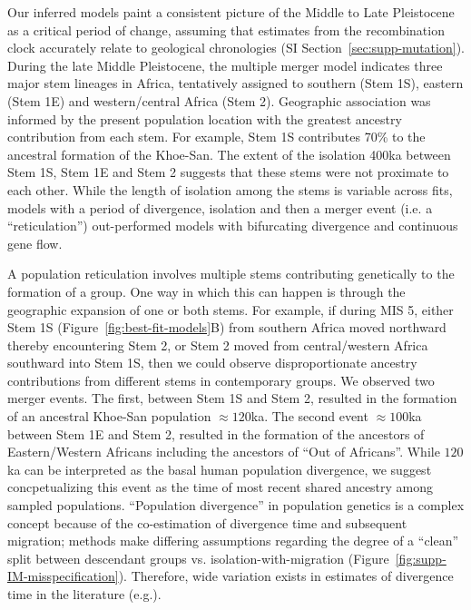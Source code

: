 \documentclass[]{article}
\begin{document}
Our inferred models paint a consistent picture of the Middle to Late
Pleistocene as a critical period of change, assuming that estimates from the
recombination clock accurately relate to geological chronologies (SI
Section~\ref{sec:supp-mutation}). During the late Middle Pleistocene, the
multiple merger model indicates three major stem lineages in Africa,
tentatively assigned to southern (Stem 1S), eastern (Stem 1E) and
western/central Africa (Stem 2). Geographic association was informed by the
present population location with the greatest ancestry contribution from each
stem. For example, Stem 1S contributes 70\% to the ancestral formation of the
Khoe-San. The extent of the isolation \>400ka between Stem 1S, Stem 1E and Stem
2 suggests that these stems were not proximate to each other. While the length
of isolation among the stems is variable across fits, models with a period of
divergence, isolation and then a merger event (i.e. a ``reticulation'')
out-performed models with bifurcating divergence and continuous gene flow. 

A population reticulation involves multiple stems contributing genetically to
the formation of a group. One way in which this can happen is through the
geographic expansion of one or both stems. For example, if during MIS 5, either
Stem 1S (Figure~\ref{fig:best-fit-models}B) from southern Africa moved
northward thereby encountering Stem 2, or Stem 2 moved from central/western
Africa southward into Stem 1S, then we could observe disproportionate
ancestry contributions from different stems in contemporary groups. We observed
two merger events. The first, between Stem 1S and Stem 2, resulted in the
formation of an ancestral Khoe-San population $\approx120$ka. The second event
$\approx100$ka between Stem 1E and Stem 2, resulted in the formation of the
ancestors of Eastern/Western Africans including the ancestors of ``Out of
Africans''. While $120$ka can be interpreted as the basal human population divergence,
we suggest concpetualizing this event as the time of most recent
shared ancestry among sampled populations.
``Population divergence'' in population genetics is a complex concept because 
of the co-estimation of divergence time and subsequent migration;
methods make differing assumptions regarding the degree of a ``clean'' split 
between descendant groups vs. isolation-with-migration 
(Figure~\ref{fig:supp-IM-misspecification}).
Therefore, wide variation exists in estimates of 
divergence time in the literature (e.g.\citep{Pagani2015-pz}). 
\end{document}
